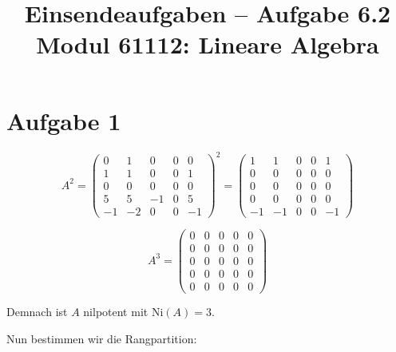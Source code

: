 \documentclass[a4paper,12pt]{article}
\title{Einsendeaufgaben -- Aufgabe 6.2\\[0.5em]
\large Modul 61112: Lineare Algebra}
\author{}
\date{}
\begin{document}
\maketitle

\section*{Aufgabe 1}

\[
A^2 =
\begin{pmatrix}
0 & 1 & 0 & 0 & 0 \\
1 & 1 & 0 & 0 & 1 \\
0 & 0 & 0 & 0 & 0 \\
5 & 5 & -1 & 0 & 5 \\
-1 & -2 & 0 & 0 & -1
\end{pmatrix}^2
=
\begin{pmatrix}
1 & 1 & 0 & 0 & 1 \\
0 & 0 & 0 & 0 & 0 \\
0 & 0 & 0 & 0 & 0 \\
0 & 0 & 0 & 0 & 0 \\
-1 & -1 & 0 & 0 & -1
\end{pmatrix}
\]

\[
A^3 =
\begin{pmatrix}
0 & 0 & 0 & 0 & 0 \\
0 & 0 & 0 & 0 & 0 \\
0 & 0 & 0 & 0 & 0 \\
0 & 0 & 0 & 0 & 0 \\
0 & 0 & 0 & 0 & 0
\end{pmatrix}
\]

Demnach ist $A$ nilpotent mit $\mathrm{Ni}(A) = 3$.

Nun bestimmen wir die Rangpartition:
\end{document}

